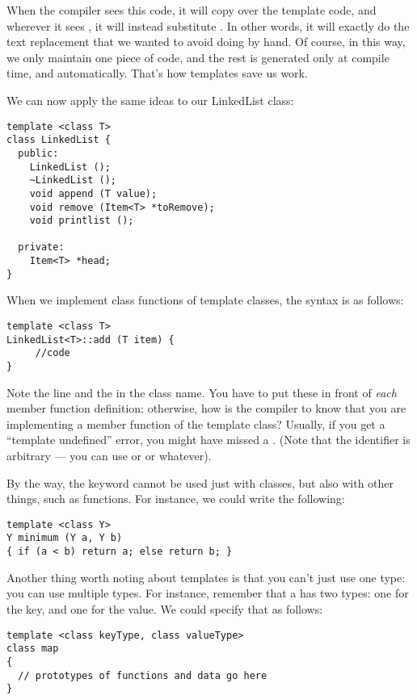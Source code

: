 When the compiler sees this code, it will copy over the template code,
and wherever it sees , it will instead substitute
. In other words, it will exactly do the text replacement
that we wanted to avoid doing by hand. Of course, in this way, we only
maintain one piece of code, and the rest is generated only at compile
time, and automatically. That's how templates save us work.

We can now apply the same ideas to our LinkedList class:

\begin{verbatim}
template <class T>
class LinkedList {
  public:
    LinkedList ();
    ~LinkedList ();
    void append (T value);
    void remove (Item<T> *toRemove);
    void printlist ();
  
  private:
    Item<T> *head;
}
\end{verbatim}
   
When we implement class functions of template classes, the syntax is
as follows:

\begin{verbatim}
template <class T>
LinkedList<T>::add (T item) {
     //code
}
\end{verbatim}

Note the  line and the
 in the class name. 
You have to put these in front of \emph{each} member function
definition; otherwise, how is the compiler to know that you are
implementing a member function of the template class?
Usually, if you get a ``template undefined'' error, you might have
missed a .
(Note that the identifier  is arbitrary ---
you can use  or  or whatever). 

By the way, the keyword  cannot be used just with
classes, but also with other things, such as functions.
For instance, we could write the following:

\begin{verbatim}
template <class Y>
Y minimum (Y a, Y b)
{ if (a < b) return a; else return b; }
\end{verbatim}

Another thing worth noting about templates is that you can't just use
one type: you can use multiple types. For instance, remember
that a  has two types: one for the key, and one for the
value. We could specify that as follows:

\begin{verbatim}
template <class keyType, class valueType>
class map
{
  // prototypes of functions and data go here
}
\end{verbatim}


